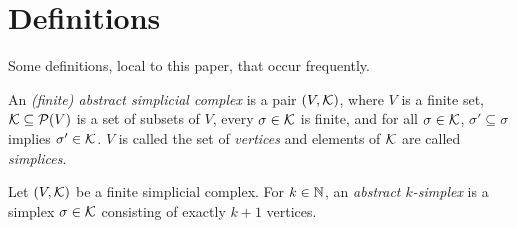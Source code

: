 \chapter{Definitions}
\label{chap:def}

Some definitions, local to this paper, that occur frequently.

\begin{definition}
  \label{def:fin_abstr_simpl_complex}
  \leanok
  An \emph{(finite) abstract simplicial complex} is a pair $(V,\mathcal{K})$, 
  where $V$ is a finite set, 
  $\mathcal{K} \subseteq \mathcal{P}(V)$ is a set of subsets of $V$, 
  every $\sigma \in \mathcal{K}$ is finite, 
  and for all $\sigma \in \mathcal{K}$, 
  $\sigma' \subseteq \sigma$ implies $\sigma' \in \mathcal{K}$. 
  $V$ is called the set of \emph{vertices} 
  and elements of $\mathcal{K}$ are called \emph{simplices}.
\end{definition}

\begin{definition}
  \label{def:fin_abstr_simplex}
  \leanok
  Let $(V,\mathcal{K})$ be a finite simplicial complex. 
  For $k \in \mathbb{N}$, an \emph{abstract $k$-simplex} is 
  a simplex $\sigma \in \mathcal{K}$ consisting of exactly $k+1$ vertices.
\end{definition}